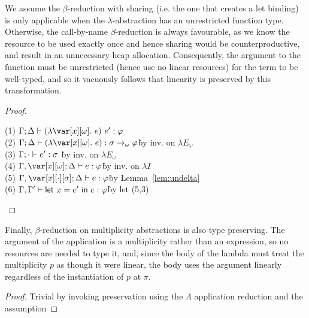 \noindent We assume the $\beta$-reduction with sharing (i.e. the one that creates a let
binding) is only applicable when the $\lambda$-abstraction has an unrestricted
function type. Otherwise, the call-by-name $\beta$-reduction is always
favourable, as we know the resource to be used exactly once and hence sharing
would be counterproductive, and result in an unnecessary heap allocation.
%
Consequently, the argument to the function must be unrestricted (hence use no
linear resources) for the term to be well-typed, and so it vacuously follows
that linearity is preserved by this transformation.

\BetaReductionSharingTheorem

\begin{proof}
~
\begin{tabbing}
    (1) $\G;\D \vdash (\lambda \xo.~e)~e' : \vp$\\
    (2) $\G; \D \vdash (\lambda \xo.~e) : \s \to_\omega \vp$\` by inv. on $\lambda E_\omega$\\
    (3) $\Gamma; \cdot \vdash e' : \sigma$ \` by inv. on $\lambda E_\omega$\\
    (4) $\G,\xo; \D \vdash e : \vp$\` by inv. on $\lambda I$\\
    (5) $\G, \x[\cdot][\s]; \D \vdash e : \vp$\` by Lemma~\ref{lem:undelta}\\
    (6) $\Gamma,\Gamma' \vdash \mathsf{let}~x = e'~\mathsf{in}~e : \varphi$\` by let (5,3)\\
\end{tabbing}
\end{proof}

\noindent Finally, $\beta$-reduction on multiplicity abstractions is also type
preserving. The argument of the application is a multiplicity rather than an
expression, so no resources are needed to type it, and, since the body of the
lambda must treat the multiplicity $p$ as though it were linear, the body uses
the argument linearly regardless of the instantiation of $p$ at $\pi$.

\BetaReductionMultTheorem

\begin{proof}
    Trivial by invoking preservation using the $\Lambda$ application reduction and the assumption
\end{proof}


